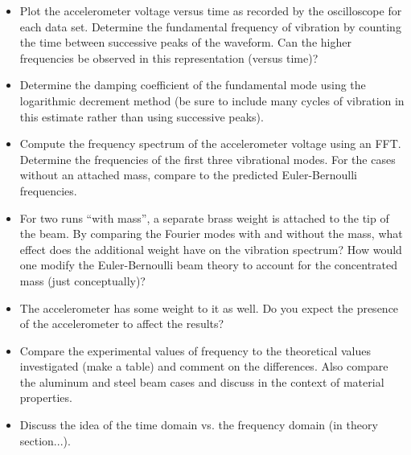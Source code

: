 \documentclass[12pt]{article}
\begin{document}
\begin{itemize}
\item Plot the accelerometer voltage versus time as recorded by the oscilloscope for each data set. Determine the fundamental frequency of vibration by counting the time between successive peaks of the waveform. Can the higher frequencies be observed in this representation (versus time)?
\item Determine the damping coefficient of the fundamental mode using the logarithmic decrement method (be sure to include many cycles of vibration in this estimate rather than using successive peaks).
\item Compute the frequency spectrum of the accelerometer voltage using an FFT. Determine the frequencies of the first three vibrational modes. For the cases without an attached mass, compare to the predicted Euler-Bernoulli frequencies.
\item For two runs ``with mass'', a separate brass weight is attached to the tip of the beam. By comparing the Fourier modes with and without the mass, what effect does the additional weight have on the vibration spectrum? How would one modify the Euler-Bernoulli beam theory to account for the concentrated mass (just conceptually)?
\item The accelerometer has some weight to it as well. Do you expect the presence of the accelerometer to affect the results?
\item Compare the experimental values of frequency to the theoretical values investigated (make a table) and comment on the differences. Also compare the aluminum and steel beam cases and discuss in the context of material properties.
\item Discuss the idea of the time domain vs. the frequency domain (in theory section...).
\end{itemize}
\end{document}
